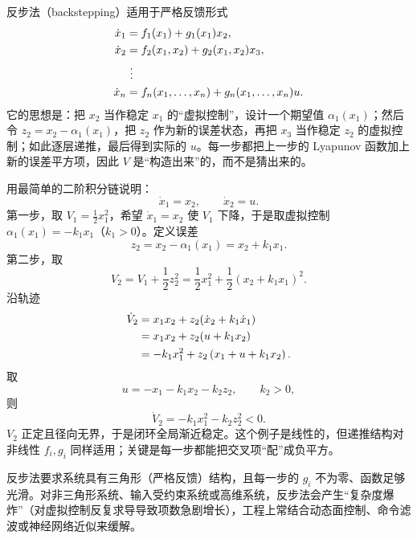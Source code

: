 \documentclass[11pt, a4paper, UTF8, fontset=none]{ctexart}
\theoremstyle{cnthm}
\begin{document}
反步法（backstepping）适用于严格反馈形式
\begin{align}
  \dot x_1&=f_1(x_1)+g_1(x_1)x_2,\notag\\
  \dot x_2&=f_2(x_1,x_2)+g_2(x_1,x_2)x_3,\notag\\
  &\ \vdots\notag\\
  \dot x_n&=f_n(x_1,\dots,x_n)+g_n(x_1,\dots,x_n)u.
  \label{eq:strict-feedback}
\end{align}
它的思想是：把 $x_2$ 当作稳定 $x_1$ 的“虚拟控制”，设计一个期望值 $\alpha_1(x_1)$；然后令 $z_2=x_2-\alpha_1(x_1)$，把 $z_2$ 作为新的误差状态，再把 $x_3$ 当作稳定 $z_2$ 的虚拟控制；如此逐层递推，最后得到实际的 $u$。每一步都把上一步的 Lyapunov 函数加上新的误差平方项，因此 $V$ 是“构造出来”的，而不是猜出来的。

用最简单的二阶积分链说明：
\begin{equation}
  \dot x_1=x_2,\qquad \dot x_2=u.
\end{equation}
第一步，取 $V_1=\frac12x_1^2$，希望 $\dot x_1=x_2$ 使 $V_1$ 下降，于是取虚拟控制 $\alpha_1(x_1)=-k_1x_1$（$k_1>0$）。定义误差
\begin{equation}
  z_2=x_2-\alpha_1(x_1)=x_2+k_1x_1.
\end{equation}
第二步，取
\begin{equation}
  V_2=V_1+\frac12z_2^2=\frac12x_1^2+\frac12(x_2+k_1x_1)^2.
\end{equation}
沿轨迹
\begin{align}
  \dot V_2
  &=x_1x_2+z_2(\dot x_2+k_1\dot x_1)\notag\\
  &=x_1x_2+z_2(u+k_1x_2)\notag\\
  &=-k_1x_1^2+z_2\left(x_1+u+k_1x_2\right).
\end{align}
取
\begin{equation}
  u=-x_1-k_1x_2-k_2z_2,\qquad k_2>0,
\end{equation}
则
\begin{equation}
  \dot V_2=-k_1x_1^2-k_2z_2^2<0.
\end{equation}
$V_2$ 正定且径向无界，于是闭环全局渐近稳定。这个例子是线性的，但递推结构对非线性 $f_i,g_i$ 同样适用；关键是每一步都能把交叉项“配”成负平方。

\begin{warnbox}[反步法的适用范围]
反步法要求系统具有三角形（严格反馈）结构，且每一步的 $g_i$ 不为零、函数足够光滑。对非三角形系统、输入受约束系统或高维系统，反步法会产生“复杂度爆炸”（对虚拟控制反复求导导致项数急剧增长），工程上常结合动态面控制、命令滤波或神经网络近似来缓解。
\end{warnbox}
\end{document}
